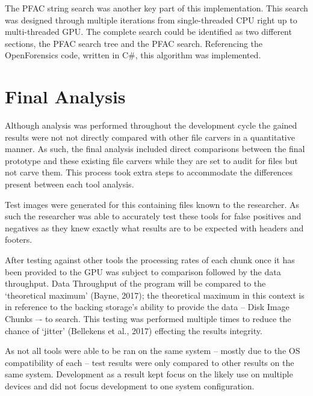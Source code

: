 The \ac{PFAC} string search was another key part of this implementation.
This search was designed through multiple iterations from single-threaded \ac{CPU} right up to multi-threaded \ac{GPU}.
The complete search could be identified as two different sections, the \ac{PFAC} search tree and the \ac{PFAC} search.
Referencing the OpenForensics code, written in C\#, this algorithm was implemented.

\section{Final Analysis}
Although analysis was performed throughout the development cycle the gained results were not not directly compared with other file carvers in a quantitative manner.
As such, the final analysis included direct comparisons between the final prototype and these existing file carvers while they are set to audit for files but not carve them.
This process took extra steps to accommodate the differences present between each tool analysis.

Test images were generated for this containing files known to the researcher.
As such the researcher was able to accurately test these tools for false positives and negatives as they knew exactly what results are to be expected with headers and footers.

After testing against other tools the processing rates of each chunk once it has been provided to the \ac{GPU} was subject to comparison followed by the data throughput.
Data Throughput of the program will be compared to the `theoretical maximum' (Bayne, 2017); the theoretical maximum in this context is in reference to the backing storage's ability to provide the data -- Disk Image Chunks –- to search.
This testing was performed multiple times to reduce the chance of `jitter' (Bellekens et al., 2017) effecting the results integrity.

As not all tools were able to be ran on the same system -- mostly due to the \ac{OS} compatibility of each – test results were only compared to other results on the same system.
Development as a result kept focus on the likely use on multiple devices and did not focus development to one system configuration.

